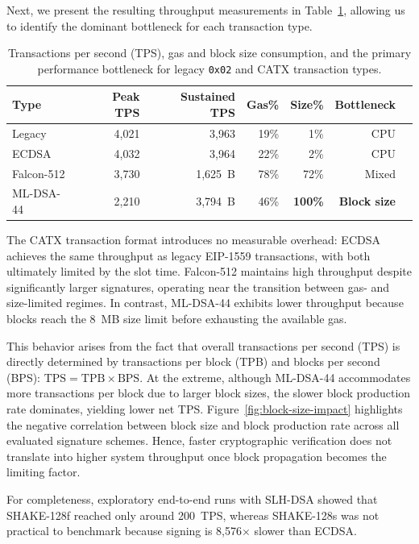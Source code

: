 Next, we present the resulting throughput measurements in Table~\ref{tab:throughput}, allowing us to identify the dominant bottleneck for each transaction type.
\begin{table}[htbp]
\centering
\caption{Transactions per second (TPS), gas and block size consumption, and the primary performance bottleneck for legacy \texttt{0x02} and CATX transaction types.}
\label{tab:throughput}
\setlength{\tabcolsep}{5pt}
\begin{tabular}{@{}lrrrrrr@{}}
\toprule
\textbf{Type} & \textbf{Peak TPS} & \textbf{Sustained TPS} & \textbf{Gas\%} & \textbf{Size\%} & \textbf{Bottleneck} \\
\midrule
Legacy & 4,021 & 3,963 & 19\% & 1\% & CPU \\
ECDSA & 4,032 & 3,964 & 22\% & 2\% & CPU \\
Falcon-512 & 3,730 & 1,625~B & 78\% & 72\% & Mixed \\
ML-DSA-44 & 2,210 & 3,794~B & 46\% & \textbf{100\%} & \textbf{Block size} \\
\bottomrule
\end{tabular}%
\end{table}
The CATX transaction format introduces no measurable overhead: ECDSA achieves the same throughput as legacy EIP-1559 transactions, with both ultimately limited by the slot time. 
Falcon-512 maintains high throughput despite significantly larger signatures, operating near the transition between gas- and size-limited regimes. 
In contrast, ML-DSA-44 exhibits lower throughput because blocks reach the 8~MB size limit before exhausting the available gas.

This behavior arises from the fact that overall transactions per second (TPS) is directly determined by transactions per block (TPB) and blocks per second (BPS): $\text{TPS}=\text{TPB}\times\text{BPS}$. 
At the extreme, although ML-DSA-44 accommodates more transactions per block due to larger block sizes, the slower block production rate dominates, yielding lower net TPS. 
Figure~\ref{fig:block-size-impact} highlights the negative correlation between block size and block production rate across all evaluated signature schemes. 
Hence, faster cryptographic verification does not translate into higher system throughput once block propagation becomes the limiting factor.

For completeness, exploratory end-to-end runs with SLH-DSA showed that SHAKE-128f reached only around 200~TPS, whereas SHAKE-128s was not practical to benchmark because signing is 8{,}576$\times$ slower than ECDSA.

